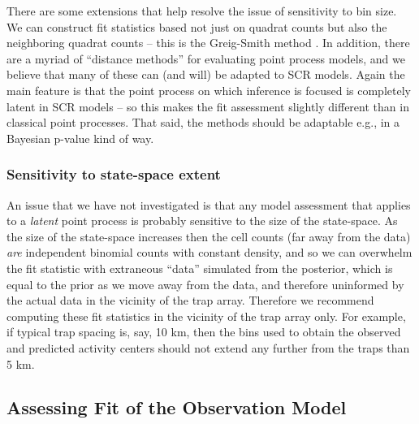There are some extensions that help resolve the issue of sensitivity
to bin size. We can construct fit statistics based not just
on quadrat counts but also the neighboring quadrat counts -- this is
the Greig-Smith method \citep{greig-smith:1964}.
In addition, there are a myriad of ``distance
methods'' for evaluating point process models,
 and we believe that many
of these can (and will) be adapted to SCR models.
Again the main
feature is that the point process on which inference is focused is
completely latent in SCR models -- so this makes the fit assessment
slightly different than in classical point processes. That said, the
methods should be adaptable e.g., in a Bayesian p-value kind of way.


\subsubsection{Sensitivity to state-space extent}

An issue that we have not investigated is that any model assessment
that applies to a {\it latent} point process is probably sensitive to
the size of the state-space. As the size of the state-space increases
then the cell counts (far away from the data) {\it are} independent
binomial counts with constant density, and so we can overwhelm the fit
statistic with extraneous ``data'' simulated from the posterior, which
is equal to the prior as we move away from the data, and therefore
uninformed by the actual data in the vicinity of the trap array.
Therefore we recommend computing these fit statistics in the vicinity
of the trap array only. For example, if typical trap spacing is, say,
10 km, then the bins used to obtain the observed and predicted
activity centers should not extend any further from the traps than 5
km.




\subsection{Assessing  Fit of the Observation Model}
\label{gof.sec.obsfit}

